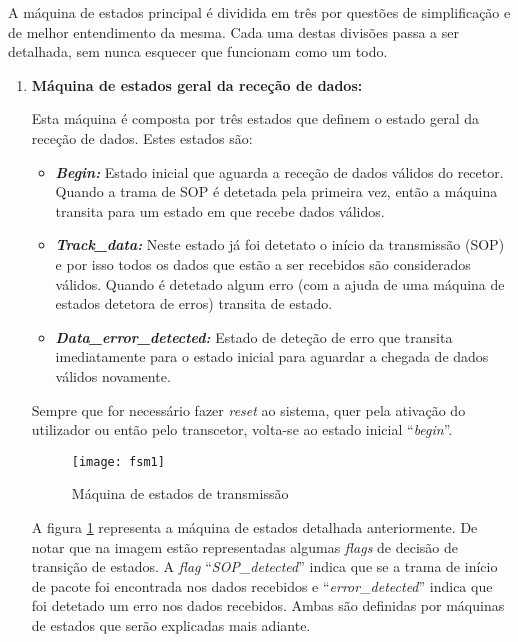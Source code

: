 A máquina de estados principal é dividida em três por questões de simplificação e de melhor entendimento da mesma. Cada uma destas divisões passa a ser detalhada, sem nunca esquecer que funcionam como um todo.

\begin{enumerate}
	\item \textbf{Máquina de estados geral da receção de dados:}
	
	Esta máquina é composta por três estados que definem o estado geral da receção de dados. Estes estados são:
	\begin{itemize}
		\item \textbf{\textit{Begin:}} Estado inicial que aguarda a receção de dados válidos do recetor. Quando a trama de SOP é detetada pela primeira vez, então a máquina transita para um estado em que recebe dados válidos. 
		
		\item \textbf{\textit{Track\_data:}} Neste estado já foi detetato o início da transmissão (SOP) e por isso todos os dados que estão a ser recebidos são considerados válidos. Quando é detetado algum erro (com a ajuda de uma máquina de estados detetora de erros) transita de estado.
		
		\item \textbf{\textit{Data\_error\_detected:} }Estado de deteção de erro que transita imediatamente para o estado inicial para aguardar a chegada de dados válidos novamente.
		
	\end{itemize}

	Sempre que for necessário fazer \textit{reset} ao sistema, quer pela ativação do utilizador ou então pelo transcetor, volta-se ao estado inicial ``\textit{begin}''.
	
	
	\begin{figure}[h!]
		\begin{center}
			\leavevmode
			\texttt{[image: fsm1]}
			\captionsetup{width=1.0\linewidth}
			\caption[Máquina de estados de transmissão]{Máquina de estados de transmissão}
			\label{fig:FSM1}
	\end{center}
	\end{figure}
	
	A figura \ref{fig:FSM1} representa a máquina de estados detalhada anteriormente. De notar que na imagem estão representadas algumas \textit{flags} de decisão de transição de estados. A \textit{flag} ``\textit{SOP\_detected}'' indica que se a trama de início de pacote foi encontrada nos dados recebidos e ``\textit{error\_detected}'' indica que foi detetado um erro nos dados recebidos. Ambas são definidas por máquinas de estados que serão explicadas mais adiante.
	

\end{enumerate}
